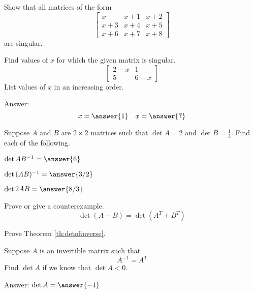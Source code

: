 \documentclass{ximera}
\begin{document}
\begin{problem}\label{prob:singmatrixdet2} Show that all matrices of the form
$$\begin{bmatrix}x&x+1&x+2\\x+3&x+4&x+5\\x+6&x+7&x+8\end{bmatrix}$$
are singular.
\end{problem}

\begin{problem}\label{prob:singmatrixdet3}
Find values of $x$ for which the given matrix is singular.
$$\begin{bmatrix}2-x&1\\5&6-x\end{bmatrix}$$
List values of $x$ in an increasing order.

Answer:
$$x=\answer{1}\quad x=\answer{7}$$
\end{problem}

\begin{problem}
Suppose $A$ and $B$ are $2\times 2$ matrices such that $\det{A}=2$ and $\det{B}=\frac{1}{3}$.  Find each of the following.
  \begin{problem}\label{prob:detproduct1a}
  $\det{AB^{-1}}=\answer{6}$
  \end{problem}
  
   \begin{problem}\label{prob:detproduct1b}
  $\det{(AB)^{-1}}=\answer{3/2}$
  \end{problem}
  
   \begin{problem}\label{prob:detproduct1c}
  $\det{2AB}=\answer{8/3}$
  \end{problem}
\end{problem}

\begin{problem}\label{prob:dettruefalse}
Prove or give a counterexample.
   $$\det{(A+B)}=\det{(A^T+B^T)}$$
  
\end{problem}

\begin{problem}\label{prob:proofdetofinverse}
Prove Theorem \ref{th:detofinverse}.
\end{problem}

\begin{problem}\label{prob:detinvertible1}
Suppose $A$ is an invertible matrix such that $$A^{-1}=A^T$$
Find $\det{A}$ if we know that $\det{A}<0$.

Answer: $\det{A}=\answer{-1}$
\end{problem}
\end{document}
